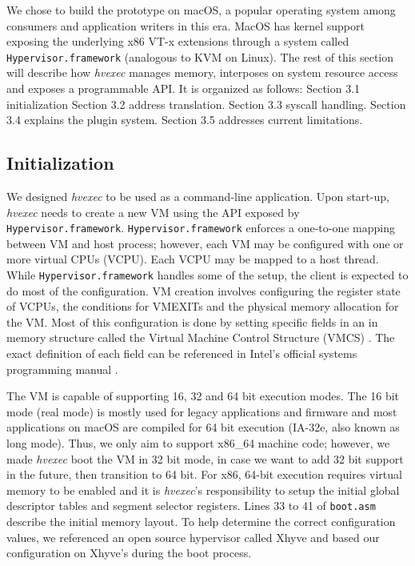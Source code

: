 \documentclass{article}
\newcommand{\PROJNAME}{\textit{hvexec}}
\begin{document}
We chose to build the prototype on macOS, a popular operating system among consumers and application writers in this era.
MacOS has kernel support exposing the underlying x86 VT-x extensions through a system called \texttt{Hypervisor.framework} (analogous to KVM on Linux).
The rest of this section will describe how \PROJNAME{} manages memory, interposes on system resource access and exposes a programmable API. It is organized as follows: Section 3.1 initialization Section 3.2 address translation. Section 3.3 syscall handling. Section 3.4 explains the plugin system. Section 3.5 addresses current limitations.

\subsection{Initialization}
We designed \PROJNAME{} to be used as a command-line application.
Upon start-up, \PROJNAME{} needs to create a new VM using the API exposed by \texttt{Hypervisor.framework}.
\texttt{Hypervisor.framework} enforces a one-to-one mapping between VM and host process; however, each VM may be configured with one or more virtual CPUs (VCPU). Each VCPU may be mapped to a host thread.
While \texttt{Hypervisor.framework} handles some of the setup, the client is expected to do most of the configuration.
VM creation involves configuring the register state of VCPUs, the conditions for VMEXITs and the physical memory allocation for the VM.
Most of this configuration is done by setting specific fields in an in memory structure called the Virtual Machine Control Structure (VMCS) \cite{intelmanual}.
The exact definition of each field can be referenced in Intel's official systems programming manual \cite{intelmanual}.

The VM is capable of supporting 16, 32 and 64 bit execution modes.
The 16 bit mode (real mode) is mostly used for legacy applications and firmware and most applications on macOS are compiled for 64 bit execution (IA-32e, also known as long mode).
Thus, we only aim to support x86\_64 machine code; however, we made \PROJNAME{} boot the VM in 32 bit mode, in case we want to add 32 bit support in the future, then transition to 64 bit.
For x86, 64-bit execution requires virtual memory to be enabled and it is \PROJNAME{}'s responsibility to setup the initial global descriptor tables and segment selector registers.
Lines 33 to 41 of \texttt{boot.asm} describe the initial memory layout.
To help determine the correct configuration values, we referenced an open source hypervisor called Xhyve and based our configuration on Xhyve's during the boot process.
\end{document}
